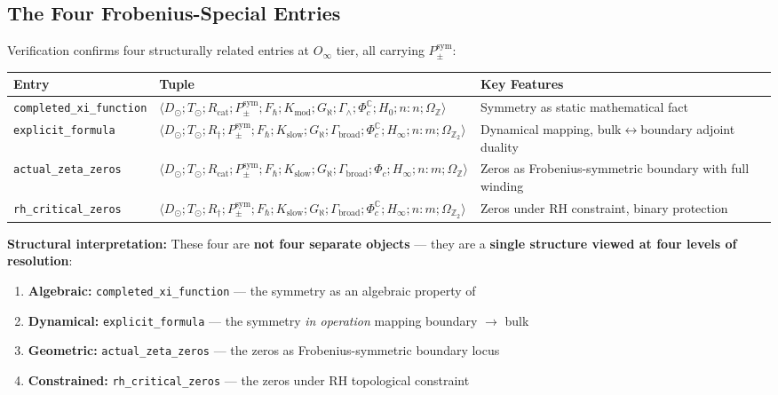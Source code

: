 \documentclass[12pt,a4paper]{article}
\begin{document}
\subsection{The Four Frobenius-Special Entries}

Verification confirms four structurally related entries at $O_{\infty}$ tier, all carrying $P_{\pm}^{\text{sym}}$:

\begin{table}[htbp]
\centering
\small
{}
\begin{tabularx}{\textwidth}{>{\centering\arraybackslash}X >{\centering\arraybackslash}X >{\centering\arraybackslash}X}
\toprule
\rowcolor{gray!25}\textbf{Entry} & \textbf{Tuple} & \textbf{Key Features} \\
\midrule
\rowcolors{1}{white}{gray!10}
\texttt{completed\_xi\_function} & $\langle D_{\odot}; T_{\odot}; R_\text{cat}; P_{\pm}^{\text{sym}}; F_{\hbar}; K_\text{mod}; G_{\aleph}; \Gamma_{\wedge}; \Phi_c^\mathbb{C}; H_0; n{:}n; \Omega_\mathbb{Z} \rangle$ & Symmetry as static mathematical fact \\
\texttt{explicit\_formula} & $\langle D_{\odot}; T_{\odot}; R_{\dagger}; P_{\pm}^{\text{sym}}; F_{\hbar}; K_\text{slow}; G_{\aleph}; \Gamma_\text{broad}; \Phi_c^\mathbb{C}; H_{\infty}; n{:}m; \Omega_{\mathbb{Z}_2} \rangle$ & Dynamical mapping, bulk$\leftrightarrow$boundary adjoint duality \\
\texttt{actual\_zeta\_zeros} & $\langle D_{\odot}; T_{\odot}; R_\text{cat}; P_{\pm}^{\text{sym}}; F_{\hbar}; K_\text{slow}; G_{\aleph}; \Gamma_\text{broad}; \Phi_c; H_{\infty}; n{:}m; \Omega_\mathbb{Z} \rangle$ & Zeros as Frobenius-symmetric boundary with full winding \\
\texttt{rh\_critical\_zeros} & $\langle D_{\odot}; T_{\odot}; R_{\dagger}; P_{\pm}^{\text{sym}}; F_{\hbar}; K_\text{slow}; G_{\aleph}; \Gamma_\text{broad}; \Phi_c^\mathbb{C}; H_{\infty}; n{:}m; \Omega_{\mathbb{Z}_2} \rangle$ & Zeros under RH constraint, binary protection \\
\bottomrule
\end{tabularx}
\end{table}

\textbf{Structural interpretation:} These four are \textbf{not four separate objects} --- they are a \textbf{single structure viewed at four levels of resolution}:

\begin{enumerate}
    \item \textbf{Algebraic:} \texttt{completed\_xi\_function} --- the symmetry as an algebraic property of \xi
    \item \textbf{Dynamical:} \texttt{explicit\_formula} --- the symmetry \emph{in operation} mapping boundary $\rightarrow$ bulk
    \item \textbf{Geometric:} \texttt{actual\_zeta\_zeros} --- the zeros as Frobenius-symmetric boundary locus
    \item \textbf{Constrained:} \texttt{rh\_critical\_zeros} --- the zeros under RH topological constraint
\end{enumerate}
\end{document}
